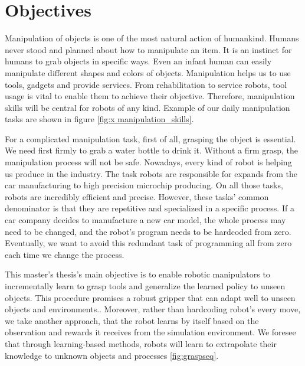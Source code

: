 \section{Objectives}

Manipulation of objects is one of the most natural action of humankind. Humans never stood and planned about how to manipulate an item. It is an instinct for humans to grab objects in specific ways. Even an infant human can easily manipulate different shapes and colors of objects. Manipulation helps us to use tools, gadgets and provide services. From rehabilitation to service robots, tool usage is vital to enable them to achieve their objective.
Therefore, manipulation skills will be central for robots of any kind. 
Example of our daily manipulation tasks are shown in figure \ref{fig:x manipulation_skills}.

For a complicated manipulation task, first of all, grasping the object is essential. We need first firmly to grab a water bottle to drink it.
Without a firm grasp, the manipulation process will not be safe. 
Nowadays, every kind of robot is helping us produce in the industry. The task robots are responsible for expands from the car manufacturing to high precision microchip producing. On all those tasks, robots are incredibly efficient and precise. However, these tasks' common denominator is that they are repetitive and specialized in a specific process. If a car company decides to manufacture a new car model, the whole process may need to be changed, and the robot's program needs to be hardcoded from zero. Eventually, we want to avoid this redundant task of programming all from zero each time we change the process.

This master's thesis's main objective is to enable robotic 
manipulators to incrementally learn to grasp tools and generalize the learned policy to unseen objects. This procedure promises a robust gripper that can adapt well to unseen objects and environments.. Moreover, rather than hardcoding robot's every move, we take another approach, that the robot learns by itself based on the observation and rewards it receives from the simulation environment. We foresee that through learning-based methods, robots will learn to extrapolate their knowledge to unknown objects and processes \ref{fig:graspseq}.

